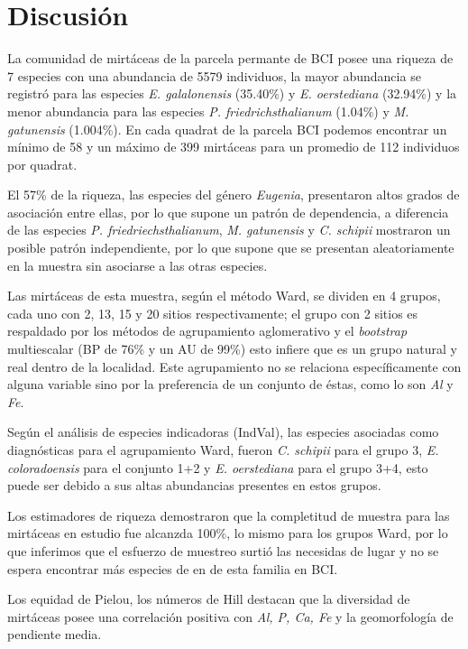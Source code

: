 \documentclass[11pt,]{article}
\begin{document}
\section{Discusión}\label{discusiuxf3n}

La comunidad de mirtáceas de la parcela permante de BCI posee una
riqueza de 7 especies con una abundancia de 5579 individuos, la mayor
abundancia se registró para las especies \emph{E. galalonensis}
(35.40\%) y \emph{E. oerstediana} (32.94\%) y la menor abundancia para
las especies \emph{P. friedrichsthalianum} (1.04\%) y \emph{M.
gatunensis} (1.004\%). En cada quadrat de la parcela BCI podemos
encontrar un mínimo de 58 y un máximo de 399 mirtáceas para un promedio
de 112 individuos por quadrat.

El 57\% de la riqueza, las especies del género \emph{Eugenia},
presentaron altos grados de asociación entre ellas, por lo que supone un
patrón de dependencia, a diferencia de las especies \emph{P.
friedriechsthalianum}, \emph{M. gatunensis} y \emph{C. schipii}
mostraron un posible patrón independiente, por lo que supone que se
presentan aleatoriamente en la muestra sin asociarse a las otras
especies.

Las mirtáceas de esta muestra, según el método Ward, se dividen en 4
grupos, cada uno con 2, 13, 15 y 20 sitios respectivamente; el grupo con
2 sitios es respaldado por los métodos de agrupamiento aglomerativo y el
\emph{bootstrap} multiescalar (BP de 76\% y un AU de 99\%) esto infiere
que es un grupo natural y real dentro de la localidad. Este agrupamiento
no se relaciona específicamente con alguna variable sino por la
preferencia de un conjunto de éstas, como lo son \emph{Al} y \emph{Fe}.

Según el análisis de especies indicadoras (IndVal), las especies
asociadas como diagnósticas para el agrupamiento Ward, fueron \emph{C.
schipii} para el grupo 3, \emph{E. coloradoensis} para el conjunto 1+2 y
\emph{E. oerstediana} para el grupo 3+4, esto puede ser debido a sus
altas abundancias presentes en estos grupos.

Los estimadores de riqueza demostraron que la completitud de muestra
para las mirtáceas en estudio fue alcanzda 100\%, lo mismo para los
grupos Ward, por lo que inferimos que el esfuerzo de muestreo surtió las
necesidas de lugar y no se espera encontrar más especies de en de esta
familia en BCI.

Los equidad de Pielou, los números de Hill destacan que la diversidad de
mirtáceas posee una correlación positiva con \emph{Al, P, Ca, Fe} y la
geomorfología de pendiente media.
\end{document}
